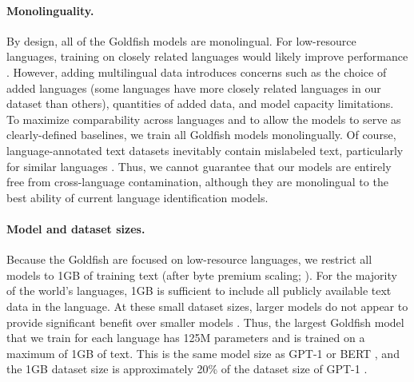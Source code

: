 \documentclass[11pt]{article}
\begin{document}
\paragraph{Monolinguality.}
By design, all of the Goldfish models are monolingual.
For low-resource languages, training on closely related languages would likely improve performance \citep{conneau-etal-2020-unsupervised,chang-etal-2023-multilinguality}.
However, adding multilingual data introduces concerns such as the choice of added languages (some languages have more closely related languages in our dataset than others), quantities of added data, and model capacity limitations.
To maximize comparability across languages and to allow the models to serve as clearly-defined baselines, we train all Goldfish models monolingually.
Of course, language-annotated text datasets inevitably contain mislabeled text, particularly for similar languages \citep{caswell-etal-2020-language,blevins-zettlemoyer-2022-language,kreutzer-etal-2022-quality}.
Thus, we cannot guarantee that our models are entirely free from cross-language contamination, although they are monolingual to the best ability of current language identification models.

\paragraph{Model and dataset sizes.}
Because the Goldfish are focused on low-resource languages, we restrict all models to 1GB of training text (after byte premium scaling; \citealp{arnett2024bit}).
For the majority of the world's languages, 1GB is sufficient to include all publicly available text data in the language.
At these small dataset sizes, larger models do not appear to provide significant benefit over smaller models \citep{kaplan-etal-2020-scaling,hoffmann-etal-2022-training,chang-etal-2023-multilinguality}.
Thus, the largest Goldfish model that we train for each language has 125M parameters and is trained on a maximum of 1GB of text.
This is the same model size as GPT-1 \citep{radford-etal-2018-improving} or BERT \citep{devlin-etal-2019-bert}, and the 1GB dataset size is approximately 20\% of the dataset size of GPT-1 \citep{radford-etal-2018-improving}.
\end{document}

